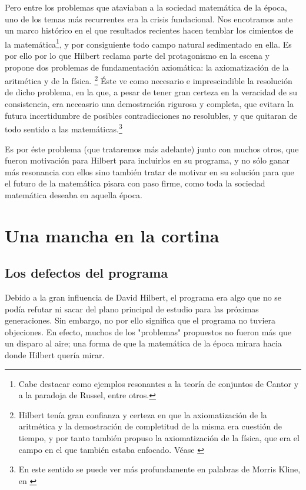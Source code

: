 Pero entre los problemas que ataviaban a la sociedad matemática de la época, uno de los temas más recurrentes era la crisis fundacional. Nos encotramos ante un marco histórico 
en el que resultados recientes hacen temblar los cimientos de la matemática\footnote{Cabe destacar como ejemplos resonantes a la teoría de conjuntos de Cantor y a la paradoja 
de Russel, entre otros.}, y por consiguiente todo campo natural sedimentado en ella. Es por ello por lo que Hilbert reclama parte del protagonismo en la escena y propone dos problemas
de fundamentación axiomática: la axiomatización de la aritmética y de la física. \footnote{Hilbert tenía gran confianza y certeza en que la axiomatización de la aritmética y la demostración de 
completitud de la misma era cuestión de tiempo, y por tanto también propuso la axiomatización de la física, que era el campo en el que también estaba enfocado. Véase \cite{kreisel1976have}}
Éste ve como necesario e imprescindible la resolución de dicho problema, en la que, a pesar de tener gran certeza en la veracidad de su consistencia, era neceasrio una demostración rigurosa
y completa, que evitara la futura incertidumbre de posibles contradicciones no resolubles, y que quitaran de todo sentido a las matemáticas.\footnote{En este sentido se puede ver más profundamente 
en palabras de Morris Kline, en \cite{kline2000matematicas}} 

Es por éste problema (que trataremos más adelante) junto con muchos otros, que fueron motivación para Hilbert para incluirlos en su programa, y no sólo ganar más resonancia con ellos sino 
también tratar de motivar en su solución para que el futuro de la matemática pisara con paso firme, como toda la sociedad matemática deseaba en aquella época.

\chapter{Una mancha en la cortina} \label{ch:Hilbert-2}

\section{Los defectos del programa}

Debido a la gran influencia de David Hilbert, el programa era algo que no se podía refutar ni sacar del plano principal de estudio para las próximas generaciones. Sin embargo,
no por ello significa que el programa no tuviera objeciones. En efecto, muchos de los "problemas" propuestos no fueron más que un disparo al aire; una forma de que la matemática 
de la época mirara hacia donde Hilbert quería mirar. 

